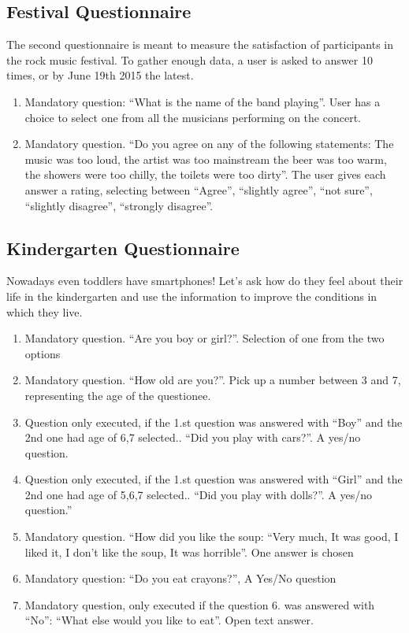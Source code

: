 \subsection{Festival Questionnaire}
\label{subsec:festivalquestionnaire}
The second questionnaire is meant to measure the satisfaction of participants in the rock music festival. To gather enough data, a user is asked to answer 10 times, or by June 19th 2015 the latest.
\begin{enumerate}
\item Mandatory question: ``What is the name of the band playing''. User has a choice to select one from all the musicians performing on the concert.
\item Mandatory question. ``Do you agree on any of the following statements: The music was too loud, the artist was too mainstream the beer was too warm, the showers were too chilly, the toilets were too dirty''. The user gives each answer a rating, selecting between ``Agree'', ``slightly agree'', ``not sure'', ``slightly disagree'', ``strongly disagree''.
\end{enumerate}

\subsection{Kindergarten Questionnaire}
\label{subsec:kindergartenquestionnaire}
Nowadays even toddlers have smartphones! Let's ask how do they feel about their life in the kindergarten and use the information to improve the conditions in which they live.
\begin{enumerate}
  \item Mandatory question. ``Are you boy or girl?''. Selection of one from the two options
  \item Mandatory question. ``How old are you?''. Pick up a number between 3 and 7, representing the age of the questionee.
  \item Question only executed, if the 1.st question was answered with ``Boy'' and the 2nd one had age of 6,7 selected.. ``Did you play with cars?''. A yes/no question.
  \item Question only executed, if the 1.st question was answered with ``Girl'' and the 2nd one had age of 5,6,7 selected.. ``Did you play with dolls?''. A yes/no question.''
  \item Mandatory question. ``How did you like the soup: ``Very much, It was good, I liked it, I don't like the soup, It was horrible''. One answer is chosen
  \item Mandatory question: ``Do you eat crayons?'', A Yes/No question
  \item Mandatory question, only executed if the question 6. was answered with ``No'': ``What else would you like to eat''. Open text answer.
\end{enumerate}
